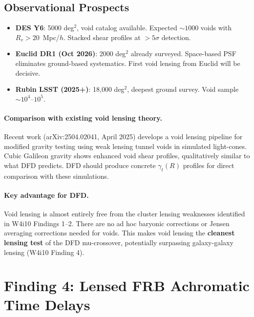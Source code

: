 \documentclass[11pt,a4paper]{article}
\begin{document}
\subsection{Observational Prospects}

\begin{itemize}
\item \textbf{DES Y6}: 5000 deg$^2$, void catalog available.
  Expected $\sim 1000$ voids with $R_v > 20$~Mpc/$h$.
  Stacked shear profiles at $> 5\sigma$ detection.
\item \textbf{Euclid DR1 (Oct 2026)}: 2000 deg$^2$ already
  surveyed.  Space-based PSF eliminates ground-based systematics.
  First void lensing from Euclid will be decisive.
\item \textbf{Rubin LSST (2025+)}: 18,000 deg$^2$, deepest
  ground survey.  Void sample $\sim 10^4$--$10^5$.
\end{itemize}

\paragraph{Comparison with existing void lensing theory.}
Recent work (arXiv:2504.02041, April 2025) develops a void
lensing pipeline for modified gravity testing using weak lensing
tunnel voids in simulated light-cones.  Cubic Galileon gravity
shows enhanced void shear profiles, qualitatively similar to
what DFD predicts.  DFD should produce concrete $\gamma_t(R)$
profiles for direct comparison with these simulations.

\paragraph{Key advantage for DFD.}
Void lensing is almost entirely free from the cluster lensing
weaknesses identified in W4i10 Findings 1--2.  There are no
ad hoc baryonic corrections or Jensen averaging corrections
needed for voids.  This makes void lensing the
\textbf{cleanest lensing test} of the DFD mu-crossover,
potentially surpassing galaxy-galaxy lensing (W4i10 Finding 4).


\section{Finding 4: Lensed FRB Achromatic Time Delays}
\label{sec:frb-lensing}
\end{document}
